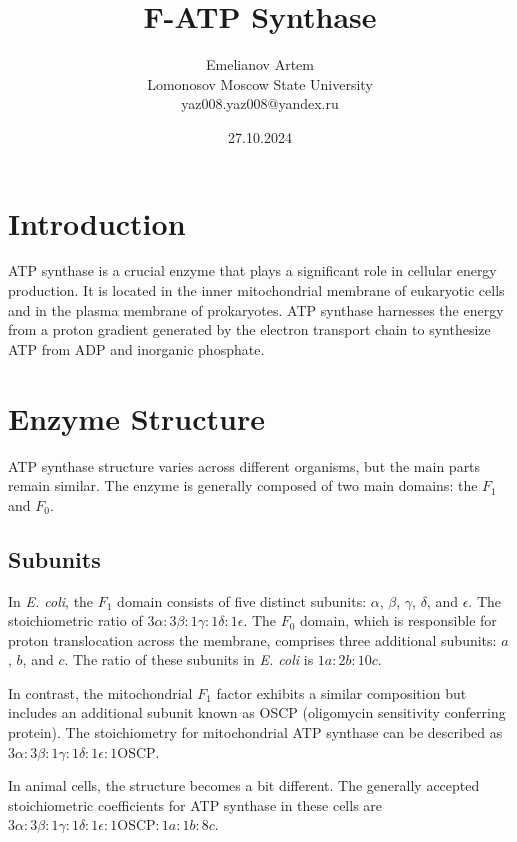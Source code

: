 \documentclass{article}
\title{F-ATP Synthase}
\author{Emelianov Artem \\ Lomonosov Moscow State University \\ yaz008.yaz008@yandex.ru}
\date{27.10.2024}
\begin{document}
\maketitle

\section{Introduction}

ATP synthase is a crucial enzyme that plays a significant role in cellular energy production. It is located in the inner mitochondrial membrane of eukaryotic cells and in the plasma membrane of prokaryotes. ATP synthase harnesses the energy from a proton gradient generated by the electron transport chain to synthesize ATP from ADP and inorganic phosphate. 

\section{Enzyme Structure}

ATP synthase structure varies across different organisms, but the main parts remain similar. The enzyme is generally composed of two main domains: the \textit{$F_1$} and \textit{$F_0$}.

\subsection{Subunits}

In \textit{E. coli}, the \textit{$F_1$} domain consists of five distinct subunits: $\alpha$, $\beta$, $\gamma$, $\delta$, and $\epsilon$. The stoichiometric ratio of $3\alpha : 3\beta : 1\gamma : 1\delta : 1\epsilon$. The \textit{$F_0$} domain, which is responsible for proton translocation across the membrane, comprises three additional subunits: $a$, $b$, and $c$. The ratio of these subunits in \textit{E. coli} is $1a : 2b : 10c$.

In contrast, the mitochondrial \textit{$F_1$} factor exhibits a similar composition but includes an additional subunit known as OSCP (oligomycin sensitivity conferring protein). The stoichiometry for mitochondrial ATP synthase can be described as $3\alpha : 3\beta : 1\gamma : 1\delta : 1\epsilon : 1\text{OSCP}$.

In animal cells, the structure becomes a bit different. The generally accepted stoichiometric coefficients for ATP synthase in these cells are $3\alpha : 3\beta : 1\gamma : 1\delta : 1\epsilon : 1\text{OSCP} : 1a : 1b : 8c$.
\end{document}
